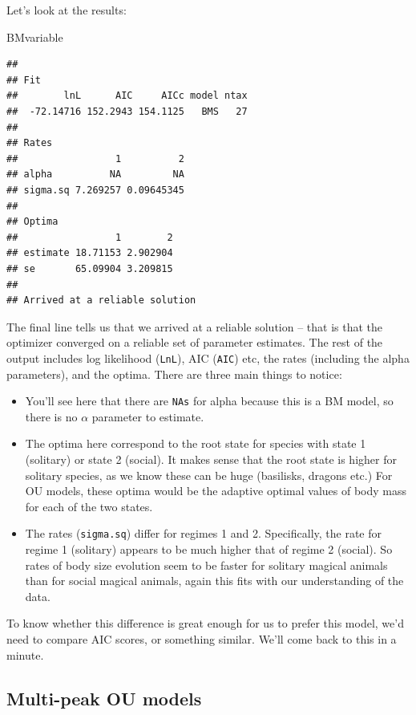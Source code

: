 \documentclass[]{book}
\newenvironment{Shaded}{\begin{snugshade}}{\end{snugshade}}
\newcommand{\NormalTok}[1]{{#1}}
\providecommand{\tightlist}{%
  \setlength{\itemsep}{0pt}\setlength{\parskip}{0pt}}
\begin{document}
Let's look at the results:

\begin{Shaded}
\begin{Highlighting}[]
\NormalTok{BMvariable}
\end{Highlighting}
\end{Shaded}

\begin{verbatim}
## 
## Fit
##        lnL      AIC     AICc model ntax
##  -72.14716 152.2943 154.1125   BMS   27
## 
## Rates
##                 1          2
## alpha          NA         NA
## sigma.sq 7.269257 0.09645345
## 
## Optima
##                 1        2
## estimate 18.71153 2.902904
## se       65.09904 3.209815
## 
## Arrived at a reliable solution
\end{verbatim}

The final line tells us that we arrived at a reliable solution -- that
is that the optimizer converged on a reliable set of parameter
estimates. The rest of the output includes log likelihood
(\texttt{LnL}), AIC (\texttt{AIC}) etc, the rates (including the alpha
parameters), and the optima. There are three main things to notice:

\begin{itemize}
\tightlist
\item
  You'll see here that there are \texttt{NAs} for alpha because this is
  a BM model, so there is no \(\alpha\) parameter to estimate.
\item
  The optima here correspond to the root state for species with state 1
  (solitary) or state 2 (social). It makes sense that the root state is
  higher for solitary species, as we know these can be huge (basilisks,
  dragons etc.) For OU models, these optima would be the adaptive
  optimal values of body mass for each of the two states.
\item
  The rates (\texttt{sigma.sq}) differ for regimes 1 and 2.
  Specifically, the rate for regime 1 (solitary) appears to be much
  higher that of regime 2 (social). So rates of body size evolution seem
  to be faster for solitary magical animals than for social magical
  animals, again this fits with our understanding of the data.
\end{itemize}

To know whether this difference is great enough for us to prefer this
model, we'd need to compare AIC scores, or something similar. We'll come
back to this in a minute.

\subsection{Multi-peak OU models}\label{multi-peak-ou-models}
\end{document}
